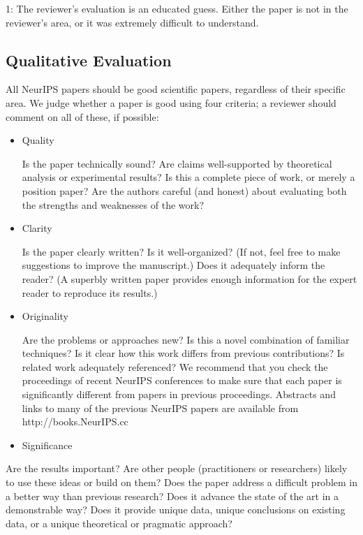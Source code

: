 1: The reviewer's evaluation is an educated guess. Either the paper is
not in the reviewer's area, or it was extremely difficult to understand.

\hypertarget{qualitative-evaluation}{%
\subsection{Qualitative Evaluation}\label{qualitative-evaluation}}

All NeurIPS papers should be good scientific papers, regardless of their
specific area. We judge whether a paper is good using four criteria; a
reviewer should comment on all of these, if possible:

\begin{itemize}
\item
  Quality

  Is the paper technically sound? Are claims well-supported by
  theoretical analysis or experimental results? Is this a complete piece
  of work, or merely a position paper? Are the authors careful (and
  honest) about evaluating both the strengths and weaknesses of the
  work?
\item
  Clarity

  Is the paper clearly written? Is it well-organized? (If not, feel free
  to make suggestions to improve the manuscript.) Does it adequately
  inform the reader? (A superbly written paper provides enough
  information for the expert reader to reproduce its results.)
\item
  Originality

  Are the problems or approaches new? Is this a novel combination of
  familiar techniques? Is it clear how this work differs from previous
  contributions? Is related work adequately referenced? We recommend
  that you check the proceedings of recent NeurIPS conferences to make sure
  that each paper is significantly different from papers in previous
  proceedings. Abstracts and links to many of the previous NeurIPS papers
  are available from http://books.NeurIPS.cc
\item
  Significance
\end{itemize}

Are the results important? Are other people (practitioners or
researchers) likely to use these ideas or build on them? Does the paper
address a difficult problem in a better way than previous research? Does
it advance the state of the art in a demonstrable way? Does it provide
unique data, unique conclusions on existing data, or a unique
theoretical or pragmatic approach?

